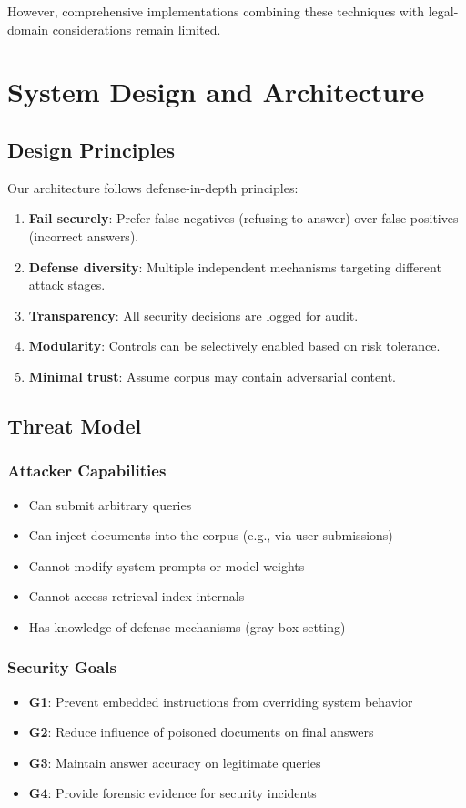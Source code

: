 \documentclass[conference]{IEEEtran}
\begin{document}
However, comprehensive implementations combining these techniques with legal-domain considerations remain limited.

\section{System Design and Architecture}

\subsection{Design Principles}

Our architecture follows defense-in-depth principles:
\begin{enumerate}
    \item \textbf{Fail securely}: Prefer false negatives (refusing to answer) over false positives (incorrect answers).
    \item \textbf{Defense diversity}: Multiple independent mechanisms targeting different attack stages.
    \item \textbf{Transparency}: All security decisions are logged for audit.
    \item \textbf{Modularity}: Controls can be selectively enabled based on risk tolerance.
    \item \textbf{Minimal trust}: Assume corpus may contain adversarial content.
\end{enumerate}

\subsection{Threat Model}

\subsubsection{Attacker Capabilities}
\begin{itemize}
    \item Can submit arbitrary queries
    \item Can inject documents into the corpus (e.g., via user submissions)
    \item Cannot modify system prompts or model weights
    \item Cannot access retrieval index internals
    \item Has knowledge of defense mechanisms (gray-box setting)
\end{itemize}

\subsubsection{Security Goals}
\begin{itemize}
    \item \textbf{G1}: Prevent embedded instructions from overriding system behavior
    \item \textbf{G2}: Reduce influence of poisoned documents on final answers
    \item \textbf{G3}: Maintain answer accuracy on legitimate queries
    \item \textbf{G4}: Provide forensic evidence for security incidents
\end{itemize}
\end{document}
